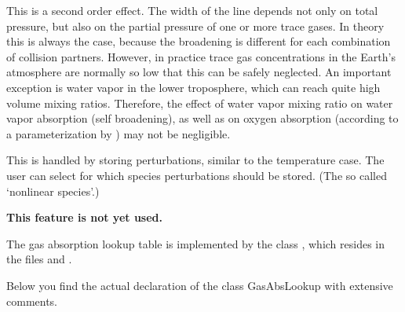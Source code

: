 This is a second order effect. The width of the line depends not only
on total pressure, but also on the partial pressure of one or more
trace gases. In theory this is always the case, because the broadening
is different for each combination of collision partners. However, in
practice trace gas concentrations in the Earth's atmosphere are
normally so low that this can be safely neglected. An important
exception is water vapor in the lower troposphere, which can reach
quite high volume mixing ratios. Therefore, the effect of water vapor
mixing ratio on water vapor absorption (self broadening), as well as
on oxygen absorption (according to a parameterization by
\citet{pwr:93}) may not be negligible.

This is handled by storing perturbations, similar to the temperature
case. The user can select for which species perturbations should be
stored. (The so called `nonlinear species'.)

\textbf{This feature is not yet used.}


The gas absorption lookup table is implemented by the class
, which resides in the files
 and .


Below you find the actual declaration of the class GasAbsLookup with
extensive comments.

